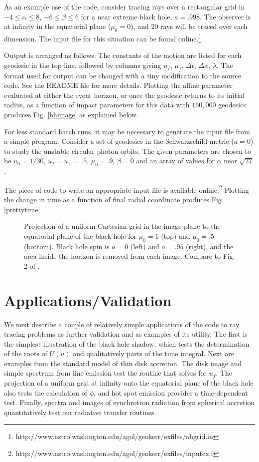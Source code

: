 \documentclass[apj]{emulateapj}
\begin{document}
As an example use of the code, consider tracing rays over a rectangular grid in $-4 \le \alpha \le 8$, $-6 \le \beta \le 6$  for a near extreme black hole, $a=.998$. The observer is at infinity in the equatorial plane ($\mu_0=0$), and $20$ rays will be traced over each dimension. The input file for this situation can be found online.\footnote{http://www.astro.washington.edu/agol/geokerr/exfiles/abgrid.in}

Output is arranged as follows. The constants of the motion are listed for each geodesic in the top line, followed by columns giving $u_f$, $\mu_f$, $\Delta t$, $\Delta \phi$, $\lambda$. The format used for output can be changed with a tiny modification to the source code. See the README file for more details. Plotting the affine parameter evaluated at either the event horizon, or once the geodesic returns to its initial radius, as a function of impact parameters for this data with $160,000$ geodesics produces Fig. \ref{bhimage} as explained below.

For less standard batch runs, it may be necessary to generate the input file from a simple program. Consider a set of geodesics in the Schwarzschild metric ($a=0$) to study the unstable circular photon orbits. The given parameters are chosen to be $u_0=1/30$, $u_f=u_+=.5$, $\mu_0=.9$, $\beta=0$ and an array of values for $\alpha$ near $\sqrt{27}$.

The piece of code to write an appropriate input file is available online.\footnote{http://www.astro.washington.edu/agol/geokerr/exfiles/inputex.f} Plotting the change in time as a function of final radial coordinate produces Fig. \ref{prettytime}.

\begin{figure}
\caption{\label{grids}Projection of a uniform Cartesian grid in the image plane to the equatorial plane of the black hole for $\mu_0=1$ (top) and $\mu_0=.5$ (bottom). Black hole spin is $a=0$ (left) and $a=.95$ (right), and the area inside the horizon is removed from each image. Compare to Fig. 2 of \citet{schnittmanbertschinger2004}.}
\end{figure}

\section{Applications/Validation}
\label{applications}

We next describe a couple of relatively simple applications of the code to ray tracing problems as further validation and as examples of its utility. The first is the simplest illustration of the black hole shadow, which tests the determination of the roots of $U(u)$ and qualitatively parts of the time integral. Next are examples from the standard model of thin disk accretion. The disk image and simple spectrum from line emission test the routine that solves for $u_f$. The projection of a uniform grid at infinity onto the equatorial plane of the black hole also tests the calculation of $\phi$, and hot spot emission provides a time-dependent test. Finally, spectra and images of synchrotron radiation from spherical accretion quantitatively test our radiative transfer routines.
\end{document}
